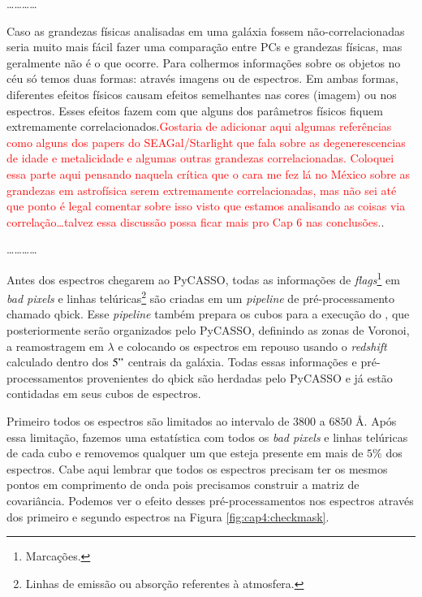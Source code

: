 \ldots \dots \ldots \ldots

Caso as grandezas físicas analisadas em uma galáxia fossem não-correlacionadas seria muito mais fácil fazer uma
comparação entre PCs e grandezas físicas, mas geralmente não é o que ocorre. Para colhermos informações sobre os objetos
no céu só temos duas formas: através imagens ou de espectros. Em ambas formas, diferentes efeitos físicos causam efeitos
semelhantes nas cores (imagem) ou nos espectros. Esses efeitos fazem com que alguns dos parâmetros físicos fiquem
extremamente correlacionados.\ojo \citneed \textcolor{red}{Gostaria de adicionar aqui algumas referências como alguns
dos papers do SEAGal/Starlight que fala sobre as degenerescencias de idade e metalicidade e algumas outras grandezas
correlacionadas. Coloquei essa parte aqui pensando naquela crítica que o cara me fez lá no México sobre as grandezas em
astrofísica serem extremamente correlacionadas, mas não sei até que ponto é legal comentar sobre isso visto que
estamos analisando as coisas via correlação\ldots talvez essa discussão possa ficar mais pro Cap 6 nas conclusões.}.

\ldots \dots \ldots \ldots
                                                                                                                                                                                                                                                                               
Antes dos espectros chegarem ao PyCASSO, todas as informações de {\em flags}\footnote{Marcações.} em {\em bad pixels} e
linhas telúricas\footnote{Linhas de emissão ou absorção referentes à atmosfera.} são criadas em um {\em pipeline} de
pré-processamento chamado {\sc qbick}. Esse {\em pipeline} também prepara os cubos para a execução do \starlight, que
posteriormente serão organizados pelo PyCASSO, definindo as zonas de Voronoi, a reamostragem em $\lambda$ e colocando os
espectros em repouso usando o {\em redshift} calculado dentro dos $5"$ centrais da galáxia. Todas essas informações e
pré-processamentos provenientes do {\sc qbick} são herdadas pelo PyCASSO e já estão contidadas em seus cubos de
espectros.

Primeiro todos os espectros são limitados ao intervalo de $3800$ a $6850$ \AA. Após essa limitação, fazemos uma
estatística com todos os {\em bad pixels} e linhas telúricas de cada cubo e removemos qualquer um que esteja presente em
mais de $5\%$ dos espectros. Cabe aqui lembrar que todos os espectros precisam ter os mesmos pontos em comprimento de
onda pois precisamos construir a matriz de covariância. Podemos ver o efeito desses pré-processamentos nos espectros
através dos primeiro e segundo espectros na Figura \ref{fig:cap4:checkmask}.

